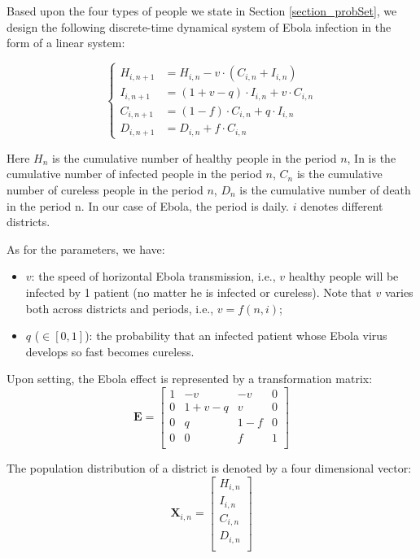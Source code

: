 \documentclass[12pt,a4paper,titlepage]{article}
\begin{document}
Based upon the four types of people we state in Section \ref{section_probSet}, we design the following discrete-time dynamical system of Ebola infection in the form of a linear system:

\begin{equation}
	\label{eqn_dynamicInfect_basic}
	\begin{cases}
		H_{i, n+1} & =  H_{i,n} - v \cdot (C_{i,n} + I_{i,n})  \\
		I_{i, n+1} & = (1+v-q) \cdot I_{i,n} + v \cdot C_{i,n}  \\
		C_{i, n+1} & = (1-f) \cdot C_{i,n} + q \cdot I_{i,n}  \\
		D_{i, n+1} & =  D_{i,n} + f \cdot C_{i,n}
	\end{cases}
\end{equation}

Here $H_n$ is the cumulative number of healthy people in the period $n$, In is the cumulative number of infected people in the period $n$, $C_n$ is the cumulative number of cureless people in the period $n$, $D_n$ is the cumulative number of death in the period n. In our case of Ebola, the period is daily. $i$ denotes different districts.

As for the parameters, we have:

\begin{itemize}
	\item $v$: the speed of horizontal Ebola transmission, i.e., $v$ healthy people will be infected by 1 patient (no matter he is infected or cureless). Note that $v$ varies both across districts and periods, i.e., $v=f(n,i)$;
	\item $q$ ($\in[0,1]$): the probability that an infected patient whose Ebola virus develops so fast becomes cureless.
\end{itemize}

Upon setting, the Ebola effect is represented by a transformation matrix:
\begin{equation}
	\label{eqn_dynamicInfect_trans}
	\textbf{E} = 
	\begin{bmatrix}
		1 & -v & -v & 0\\
		0 & 1+v-q & v & 0\\
		0 & q & 1-f & 0\\
		0 & 0 & f & 1\\
	\end{bmatrix}
\end{equation}

The population distribution of a district is denoted by a four dimensional vector:
\begin{equation}
	\label{eqn_dynamicInfect_vec}	
	\textbf{X}_{i,n} = 
	\begin{bmatrix}
		H_{i,n} \\
		I_{i,n} \\
		C_{i,n} \\
		D_{i,n} \\
	\end{bmatrix}
\end{equation}
\end{document}
